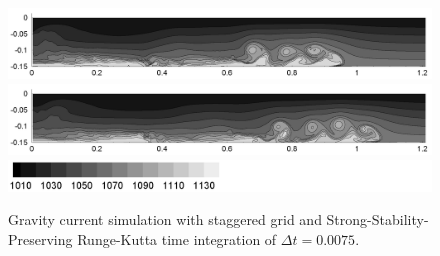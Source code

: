 \begin{figure}[htbp]
\begin{center}
\includegraphics[scale=0.55]{../figures/Staggered/Fig9case/060518c-SSPRK35-dt-0075-280-120/07.png}    \includegraphics[scale=0.55]{../figures/Staggered/Fig9case/060518c-SSPRK35-dt-0075-280-120/08.png}
\includegraphics[scale=0.55]{../figures/Staggered/Fig9case/label.png}
    \caption{Gravity current simulation with staggered grid and Strong-Stability-Preserving Runge-Kutta time integration of $\Delta t=0.0075$.}
    \label{fig:060518c-SSPRK35-dt-0075-280-120}
  \end{center}
\end{figure}


